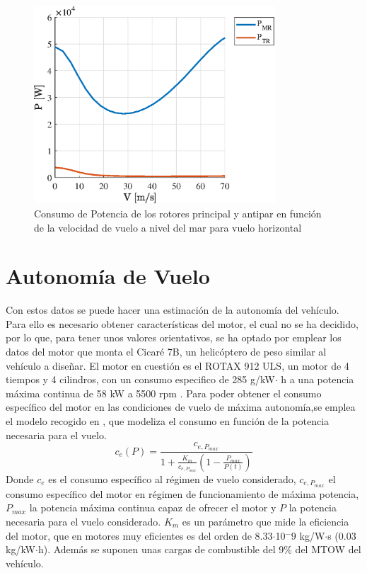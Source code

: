 \begin{figure}
	\centering
	\includegraphics[width=90mm]{graficos/PVH}
	\caption{Consumo de Potencia de los rotores principal y antipar en función de la velocidad de vuelo a nivel del mar para vuelo horizontal}
	\label{PVH}
\end{figure}

\section{Autonomía de Vuelo}

Con estos datos se puede hacer una estimación de la autonomía del vehículo. Para ello es necesario obtener características del motor, el cual no se ha decidido, por lo que, para tener unos valores orientativos, se ha optado por emplear los datos del motor que monta el Cicaré 7B, un helicóptero de peso similar al vehículo a diseñar. El motor en cuestión es el ROTAX 912 ULS, un motor de 4 tiempos y 4 cilindros, con un consumo especifico de 285 g/kW$\cdot$ h a una potencia máxima continua de 58 kW a 5500 rpm \citep{ROTAX}.
Para poder obtener el consumo específico del motor en las condiciones de vuelo de máxima autonomía,se emplea el modelo recogido en \citet{Cuerva}, que modeliza el consumo en función de la potencia necesaria para el vuelo.
\begin{equation}
	c_e(P)=\frac{c_{e,P_{max}}}{1+\frac{K_m}{c_{e,P_{max}}}(1-\frac{P_{max}}{P(t)})}
	\label{consumo}
\end{equation}
Donde $c_e$ es el consumo específico al régimen de vuelo considerado, $c_{e,P_{max}}$ el consumo específico del motor en régimen de funcionamiento de máxima potencia, $P_{max}$ la potencia máxima continua capaz de ofrecer el motor y $P$ la potencia necesaria para el vuelo considerado.
$K_m$ es un parámetro que mide la eficiencia del motor, que en motores muy eficientes es del orden de 8.33$\cdot$10$^-9$ kg/W$\cdot$s (0.03 kg/kW$\cdot$h).
Además se suponen unas cargas de combustible del 9\% del MTOW del vehículo. 

